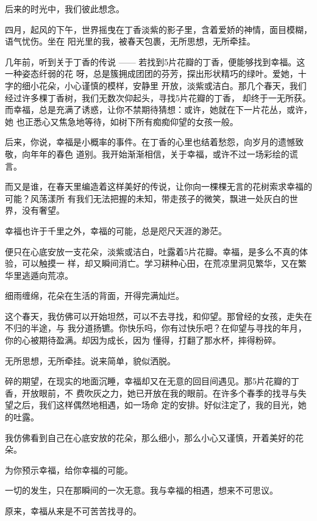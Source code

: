 \documentclass[12pt,a4paper]{article}
\begin{document}
		后来的时光中，我们彼此想念。

	\endwriting



		四月，起风的下午，世界摇曳在丁香淡紫的影子里，含着爱娇的神情，面目模糊，语气忧伤。坐在
	阳光里的我，被春天包裹，无所思想，无所牵挂。

		几年前，听到关于丁香的传说 —— 若找到5片花瓣的丁香，便能够找到幸福。这一种姿态纤弱的花
	呀，总是簇拥成团团的芬芳，探出形状精巧的绿叶。爱她，十字的细小花朵，小心谨慎的模样，安静里
	开放，淡紫或洁白。那几个春天，我们经过许多棵丁香树，我们无数次仰起头，寻找5片花瓣的丁香，
	却终于一无所获。而幸福，总是充满了诱惑，让你不禁期待猜想：或许，她就在下一片花丛，或许，她
	也正悉心又焦急地等待，如树下所有痴痴仰望的女孩一般。

		后来，你说，幸福是小概率的事件。在丁香的心里也结着愁怨，向岁月的遗憾致敬，向年年的春色
	道别。我开始渐渐相信，关于幸福，或许不过一场彩绘的谎言。

		而又是谁，在春天里编造着这样美好的传说，让你向一棵棵无言的花树索求幸福的可能？风荡漾所
	有我们无法把握的未知，带走孩子的微笑，飘进一处灰白的世界，没有奢望。

		幸福也许于千里之外，幸福的可能，总是咫尺天涯的渺茫。

		便只在心底安放一支花朵，淡紫或洁白，吐露着5片花瓣。幸福，是多么不真的体验，可以触摸一
	样，却又瞬间消亡。学习耕种心田，在荒凉里洞见繁华，又在繁华里逃遁向荒凉。

		细雨缠绵，花朵在生活的背面，开得完满灿烂。


		这个春天，我仿佛可以开始坦然，可以不去寻找，和仰望。那曾经的女孩，走失在不归的半途，与
	我分道扬镳。你快乐吗，你有过快乐吧？在仰望与寻找的年月，你的心被期待盈满。却因为成长，因为
	懂得，打翻了那水杯，摔得粉碎。


		无所思想，无所牵挂。说来简单，貌似洒脱。


		碎的期望，在现实的地面沉睡，幸福却又在无意的回目间遇见。那5片花瓣的丁香，开放眼前，不
	费吹灰之力，她已开放在我的眼前。在许多个春季的找寻与失望之后，我们这样偶然地相遇，如一场命
	定的安排。好似注定了，我的目光，她的吐露。

		我仿佛看到自己在心底安放的花朵，那么细小，那么小心又谨慎，开着美好的花朵。

		为你预示幸福，给你幸福的可能。


		一切的发生，只在那瞬间的一次无意。我与幸福的相遇，想来不可思议。

		原来，幸福从来是不可苦苦找寻的。
\end{document}
